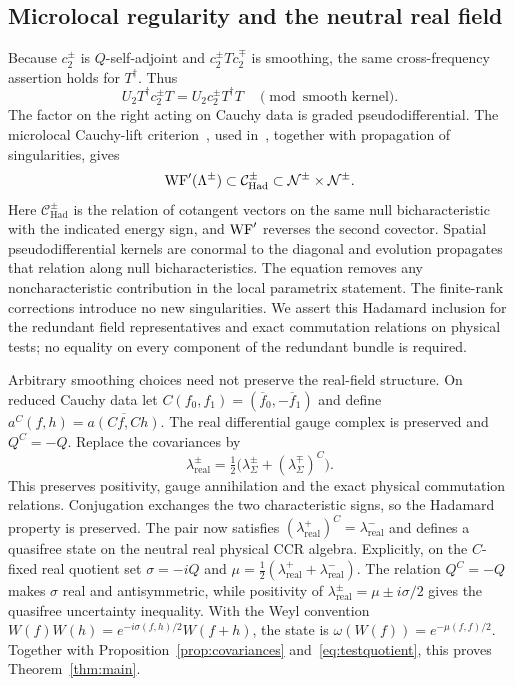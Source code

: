 \subsection{Microlocal regularity and the neutral real field}
Because $c_2^\pm$ is $Q$-self-adjoint and $c_2^\pm Tc_2^\mp$ is smoothing, the same cross-frequency assertion holds for $T^\dagger$.
Thus
\[
U_2T^\dagger c_2^\pm T
=U_2c_2^\pm T^\dagger T\quad\pmod{\text{smooth kernel}}.
\]
The factor on the right acting on Cauchy data is graded pseudodifferential.
The microlocal Cauchy-lift criterion~\cite[Proposition 11.1.1]{Gerard2019Microlocal}, used in~\cite[proof of Theorem 5.1]{Gerard2024Compact}, together with propagation of singularities, gives
\[
\operatorname{WF}'(\Lambda^\pm)\subset\mathcal C_{\mathrm{Had}}^\pm
\subset\mathcal N^\pm\times\mathcal N^\pm.
\]
Here $\mathcal C_{\mathrm{Had}}^\pm$ is the relation of cotangent vectors on the same null bicharacteristic with the indicated energy sign, and $\operatorname{WF}'$ reverses the second covector.
Spatial pseudodifferential kernels are conormal to the diagonal and evolution propagates that relation along null bicharacteristics.
The equation removes any noncharacteristic contribution in the local parametrix statement.
The finite-rank corrections introduce no new singularities.
We assert this Hadamard inclusion for the redundant field representatives and exact commutation relations on physical tests; no equality on every component of the redundant bundle is required.

Arbitrary smoothing choices need not preserve the real-field structure.
On reduced Cauchy data let $C(f_0,f_1)=(\overline f_0,-\overline f_1)$ and define $a^C(f,h)=\overline{a(Cf,Ch)}$.
The real differential gauge complex is preserved and $Q^C=-Q$.
Replace the covariances by
\[
\lambda_{\mathrm{real}}^\pm
=\tfrac12\bigl(\lambda_\Sigma^\pm+(\lambda_\Sigma^\mp)^C\bigr).
\]
This preserves positivity, gauge annihilation and the exact physical commutation relations.
Conjugation exchanges the two characteristic signs, so the Hadamard property is preserved.
The pair now satisfies $(\lambda_{\mathrm{real}}^+)^C=\lambda_{\mathrm{real}}^-$ and defines a quasifree state on the neutral real physical CCR algebra.
Explicitly, on the $C$-fixed real quotient set $\sigma=-iQ$ and $\mu=\tfrac12(\lambda_{\mathrm{real}}^++\lambda_{\mathrm{real}}^-)$.
The relation $Q^C=-Q$ makes $\sigma$ real and antisymmetric, while positivity of $\lambda_{\mathrm{real}}^\pm=\mu\pm i\sigma/2$ gives the quasifree uncertainty inequality.
With the Weyl convention $W(f)W(h)=e^{-i\sigma(f,h)/2}W(f+h)$, the state is $\omega(W(f))=e^{-\mu(f,f)/2}$.
Together with Proposition~\ref{prop:covariances} and~\eqref{eq:testquotient}, this proves Theorem~\ref{thm:main}.
